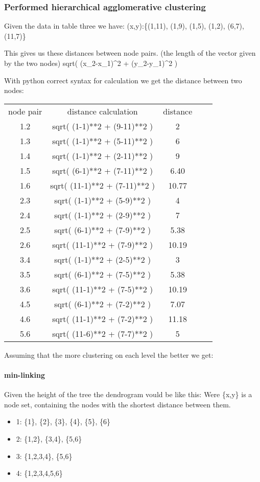 \documentclass[12pt, a4paper]{article}
\begin{document}
\subsubsection{ Performed hierarchical agglomerative clustering }
Given the data in table three we have: (x,y):\{(1,11), (1,9), (1,5), (1,2), (6,7), (11,7)\}

This gives us these distances between node pairs. (the length of the vector given by the two nodes)
sqrt( (x_2-x_1)^2 + (y_2-y_1)^2 )

With python correct syntax for calculation we get the distance between two nodes:\\ 
\begin{tabular}{ c c c c c }
node pair & distance calculation & distance \\
1.2 & sqrt( (1-1)**2 + (9-11)**2 ) & 2 \\
1.3 & sqrt( (1-1)**2 + (5-11)**2 ) & 6 \\
1.4 & sqrt( (1-1)**2 + (2-11)**2 ) & 9 \\
1.5 & sqrt( (6-1)**2 + (7-11)**2 ) & 6.40 \\
1.6 & sqrt( (11-1)**2 + (7-11)**2 ) & 10.77 \\
2.3 & sqrt( (1-1)**2 + (5-9)**2 ) & 4 \\
2.4 & sqrt( (1-1)**2 + (2-9)**2 ) & 7 \\
2.5 & sqrt( (6-1)**2 + (7-9)**2 ) & 5.38 \\
2.6 & sqrt( (11-1)**2 + (7-9)**2 ) & 10.19 \\
3.4 & sqrt( (1-1)**2 + (2-5)**2 ) & 3 \\
3.5 & sqrt( (6-1)**2 + (7-5)**2 ) & 5.38 \\
3.6 & sqrt( (11-1)**2 + (7-5)**2 ) & 10.19 \\
4.5 & sqrt( (6-1)**2 + (7-2)**2 ) & 7.07 \\
4.6 & sqrt( (11-1)**2 + (7-2)**2 ) & 11.18 \\
5.6 & sqrt( (11-6)**2 + (7-7)**2 ) & 5 \\
\end{tabular}


Assuming that the more clustering on each level the better we get: 

\paragraph{min-linking}
Given the height of the tree the dendrogram vould be like this:
Were \{x,y\} is a node set, containing the nodes with the shortest distance between them. 
\begin{itemize}
	\item 1: \{1\}, \{2\}, \{3\}, \{4\}, \{5\}, \{6\}
	\item 2: \{1,2\}, \{3,4\}, \{5,6\}
	\item 3: \{1,2,3,4\}, \{5,6\}
	\item 4: \{1,2,3,4,5,6\}
\end{itemize}
\end{document}
